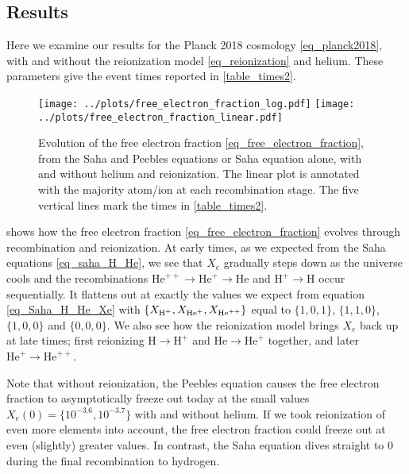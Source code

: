 \documentclass[10pt,a4paper]{article}
\begin{document}
\subsection{Results}

Here we examine our results for the Planck 2018 cosmology \eqref{eq_planck2018},
with and without the reionization model \eqref{eq_reionization} and helium.
These parameters give the event times reported in \cref{table_times2}.

\begin{figure}[ht!]
	\centering
	\texttt{[image: ../plots/free\_electron\_fraction\_log.pdf]}
	\texttt{[image: ../plots/free\_electron\_fraction\_linear.pdf]}
	\caption{%
		Evolution of the free electron fraction \eqref{eq_free_electron_fraction},
		from the Saha and Peebles equations or Saha equation alone,
		with and without helium and reionization.
		The linear plot is annotated with the majority atom/ion at each recombination stage.
		The five vertical lines mark the times in \cref{table_times2}.
	}
	\label{fig_free_electron_fraction}
\end{figure}

 shows how the free electron fraction \eqref{eq_free_electron_fraction} evolves through recombination and reionization.
At early times, as we expected from the Saha equations \eqref{eq_saha_H_He},
we see that $X_e$ gradually steps down as the universe cools and the recombinations $\text{He}^{++} \rightarrow \text{He}^+ \rightarrow \text{He}$ and $\text{H}^+ \rightarrow \text{H}$ occur sequentially.
It flattens out at exactly the values we expect from equation \eqref{eq_Saha_H_He_Xe} with $\{X_{\text{H}^+}, X_{\text{He}^+}, X_{\text{He}^{++}}\}$ equal to $\{1,0,1\}$, $\{1,1,0\}$, $\{1,0,0\}$ and $\{0,0,0\}$.
We also see how the reionization model brings $X_e$ back up at late times;
first reionizing $\text{H} \rightarrow \text{H}^+$ and $\text{He} \rightarrow \text{He}^+$ together,
and later $\text{He}^{+} \rightarrow \text{He}^{++}$.

Note that without reionization, the Peebles equation causes the free electron fraction to asymptotically freeze out today at the small values $X_e(0) = \{10^{-3.6}, 10^{-3.7}\}$ with and without helium.
If we took reionization of even more elements into account, the free electron fraction could freeze out at even (slightly) greater values.
In contrast, the Saha equation dives straight to $0$ during the final recombination to hydrogen.
\end{document}
